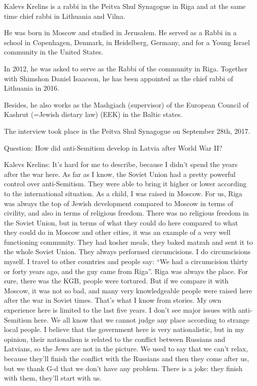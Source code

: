 Kalevs Krelins is a rabbi in the Peitva Shul Synagogue in Riga and at the same time chief rabbi in Lithuania and Vilna. 

He was born in Moscow and studied in Jerusalem. He served as a Rabbi in a school in Copenhagen, Denmark, in Heidelberg, Germany, and for a Young Israel community in the United States.  

In 2012, he was asked to serve as the Rabbi of the community in Riga. Together with Shimshon Daniel Isaacson, he has been appointed as the chief rabbi of Lithuania in 2016. 

Besides, he also works as the Mashgiach (supervisor) of the European Council of Kashrut (=Jewish dietary law) (EEK) in the Baltic states. 

The interview took place in the Peitva Shul Synagogue on September 28th, 2017. 

Question: How did anti-Semitism develop in Latvia after World War II?  

Kalevs Krelins: It’s hard for me to describe, because I didn’t spend the years after the war here. As far as I know, the Soviet Union had a pretty powerful control over anti-Semitism. They were able to bring it higher or lower according to the international situation. As a child, I was raised in Moscow. For us, Riga was always the top of Jewish development compared to Moscow in terms of civility, and also in terms of religious freedom. There was no religious freedom in the Soviet Union, but in terms of what they could do here compared to what they could do in Moscow and other cities, it was an example of a very well functioning community. They had kosher meals, they baked matzah and sent it to the whole Soviet Union. They always performed circumcisions. I do circumcisions myself. I travel to other countries and people say: “We had a circumcision thirty or forty years ago, and the guy came from Riga”. Riga was always the place. For sure, there was the KGB, people were tortured. But if we compare it with Moscow, it was not so bad, and many very knowledgeable people were raised here after the war in Soviet times. That’s what I know from stories. My own experience here is limited to the last five years. I don’t see major issues with anti-Semitism here.  We all know that we cannot judge any place according to strange local people. I believe that the government here is very nationalistic, but in my opinion, their nationalism is related to the conflict between Russians and Latvians, so the Jews are not in the picture. We used to say that we can’t relax, because they’ll finish the conflict with the Russians and then they come after us, but we thank G-d that we don’t have any problem. There is a joke: they finish with them, they’ll start with us.  

